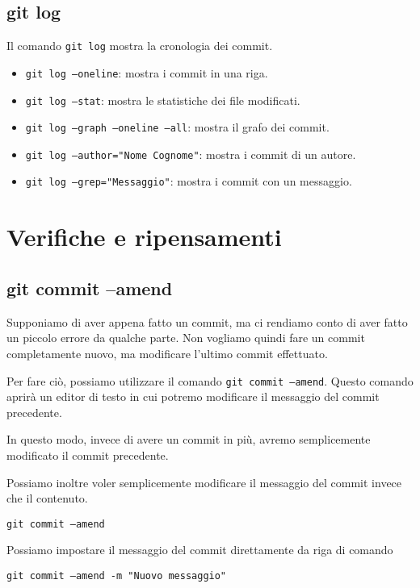 \documentclass{article}
\begin{document}
\pagebreak
\subsection{git log}
Il comando \texttt{git log} mostra la cronologia dei commit.

\begin{itemize}
    \item \texttt{git log --oneline}: mostra i commit in una riga.
    \item \texttt{git log --stat}: mostra le statistiche dei file modificati.
    \item \texttt{git log --graph --oneline --all}: mostra il grafo dei commit.
    \item \texttt{git log --author="Nome Cognome"}: mostra i commit di un autore.
    \item \texttt{git log --grep="Messaggio"}: mostra i commit con un messaggio.
\end{itemize}

\section{Verifiche e ripensamenti}
\subsection{git commit --amend}
Supponiamo di aver appena fatto un commit, ma ci rendiamo
conto di aver fatto un piccolo errore da qualche parte.
Non vogliamo quindi fare un commit completamente nuovo, ma
modificare l'ultimo commit effettuato.

Per fare ciò, possiamo utilizzare il comando \texttt{git commit --amend}.
Questo comando aprirà un editor di testo in cui potremo modificare il messaggio del commit precedente.

In questo modo, invece di avere un commit in più, avremo semplicemente modificato il commit precedente.

Possiamo inoltre voler semplicemente modificare il messaggio 
del commit invece che il contenuto.

\begin{highlight}
    \texttt{git commit --amend}
\end{highlight}
Possiamo impostare il messaggio del commit direttamente da riga di comando
\begin{highlight}
    \texttt{git commit --amend -m "Nuovo messaggio"}
\end{highlight}
\end{document}
